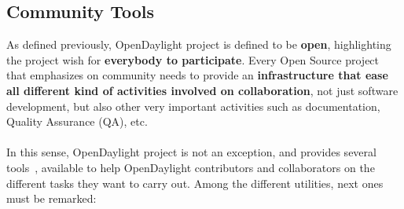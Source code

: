 \documentclass[a4paper, 12pt]{book}
\begin{document}
\subsection{Community Tools}
As defined previously, OpenDaylight project is defined to be \textbf{open}, highlighting the project wish for \textbf{everybody to participate}. Every Open Source project that emphasizes on community needs to provide an \textbf{infrastructure that ease all different kind of activities involved on collaboration}, not just software development, but also other very important activities such as documentation, Quality Assurance (QA), etc.\\
\\
In this sense, OpenDaylight project is not an exception, and provides several tools~\cite{OpenDaylightTools}, available to help OpenDaylight contributors and collaborators on the different tasks they want to carry out. Among the different utilities, next ones must be remarked:
\end{document}
